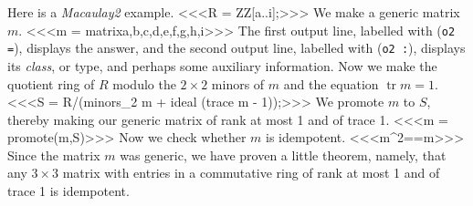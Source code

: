 \documentclass{article}
\begin{document}
\def\trace{\operatorname{tr}}

Here is a {\em Macaulay2} example.
<<<R = ZZ[a..i];>>>
We make a generic matrix $m$.
<<<m = matrix{{a,b,c},{d,e,f},{g,h,i}}>>>
The first output line, labelled with ({\tt o2 =}), displays the answer, and
the second output line, labelled with ({\tt o2 :}), displays its {\em class},
or type, and perhaps some auxiliary information.
Now we make the quotient ring of $R$ modulo the $2\times 2$ minors of $m$ and
the equation $\trace m = 1$.
<<<S = R/(minors_2 m + ideal (trace m - 1));>>>
We promote $m$ to $S$, thereby making our generic matrix of rank at most 1 and
of trace 1.
<<<m = promote(m,S)>>>
Now we check whether $m$ is idempotent.
<<<m^2==m>>>
Since the matrix $m$ was generic, we have proven a little theorem, namely, that any $3
\times 3$ matrix with entries in a commutative ring of rank at most 1 and of
trace 1 is idempotent.
\end{document}
